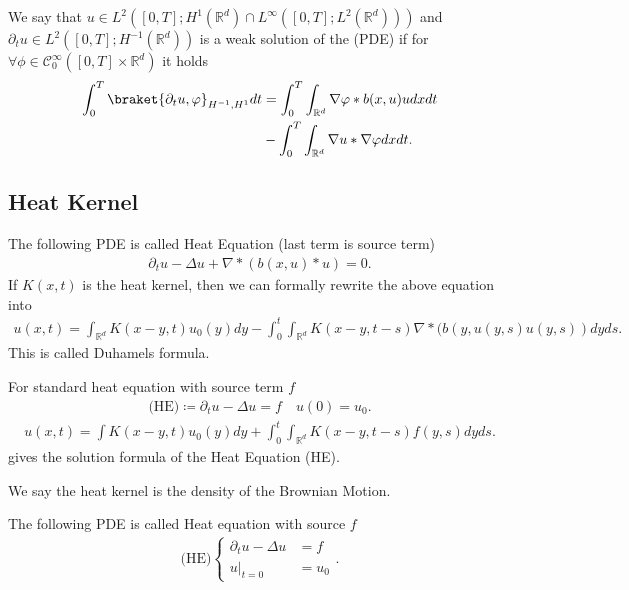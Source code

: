 \begin{definition}
  We say that $u \in  L^2([0,T];H^{1}(\mathbb{R}^{d} )\cap L^{\infty}([0,T];L^2(\mathbb{R}^{d} ))  )$
  and $\partial_t u \in  L^2([0,T];H^{-1}(\mathbb{R}^{d} ))$ is a weak solution of the (PDE) if for 
  $\forall  \phi  \in \mathcal{C}^{\infty}_0([0,T]\times \mathbb{R}^{d} )  $ it holds 
  \begin{align*}
    \int_0^{T} \braket{\partial_t u , \phi }_{H^{-1},H^{1}  } dt &= \int_0^{T} \int_{\mathbb{R}^{d} }  \nabla \phi * b(x,u) u dx dt \\
                                                                 &- \int_0^{T} \int_{\mathbb{R}^{d} }  \nabla u * \nabla \phi  dx dt
  .\end{align*} 
\end{definition}
\subsection{Heat Kernel}
\begin{definition}
  The following PDE is called Heat Equation (last term is source term)
 \begin{align*}
 \partial_t u - \Delta u + \nabla * (b(x,u)*u) = 0
 .\end{align*}
  If $K(x,t)$ is the heat kernel, then we can formally rewrite the above equation into 
  \begin{align*}
    u(x,t) =  \int_{\mathbb{R}^{d} } K(x-y,t) u_0(y) dy - \int_0^{t} \int_{\mathbb{R}^{d} }  K(x-y,t-s) \nabla * (b(y,u(y,s)u(y,s))dy ds 
  .\end{align*}
  This is called Duhamels formula.
\end{definition}
For standard heat equation with source term $f$
\begin{align*}
  \text{(HE)} \coloneqq \partial_t u - \Delta u = f \quad u(0) = u_0
.\end{align*}
\begin{align*}
  u(x,t) = \int  K(x-y,t) u_0(y) dy + \int_0^{t} \int_{\mathbb{R}^{d} }  K(x-y,t-s)f(y,s) dy ds
.\end{align*}
gives the solution formula of the Heat Equation (HE).
\begin{remark}
 We say the heat kernel is the density of the Brownian Motion. 
\end{remark}
\begin{definition}
 The following PDE is called Heat equation with source $f$ 
 \begin{align*}
   \text{(HE)}\begin{cases}
   \partial_t u - \Delta u &=f\\
   u \rvert_{t=0} &= u_0
 \end{cases} 
 .\end{align*}
\end{definition}
